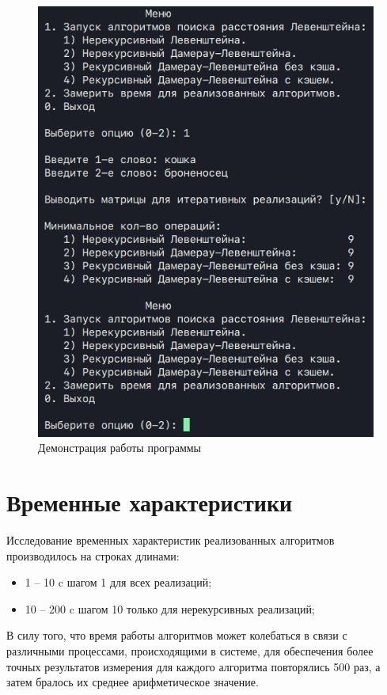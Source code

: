 \clearpage
\begin{figure}[h]
    \centering
    \includegraphics[height=0.6\textheight]{images/prog_demo.png}
    \caption{Демонстрация работы программы}
    \label{fig:prog-demo}
\end{figure}

\section{Временные характеристики}

Исследование временных характеристик реализованных алгоритмов производилось на строках длинами:

\begin{itemize}
    \item 1 -- 10 c шагом 1 для всех реализаций;
    \item 10 -- 200 c шагом 10 только для нерекурсивных реализаций;
\end{itemize}

В силу того, что время работы алгоритмов может колебаться в связи с различными процессами, происходящими в системе, для обеспечения более точных результатов измерения для каждого алгоритма повторялись 500 раз, а затем бралось их среднее арифметическое значение.

